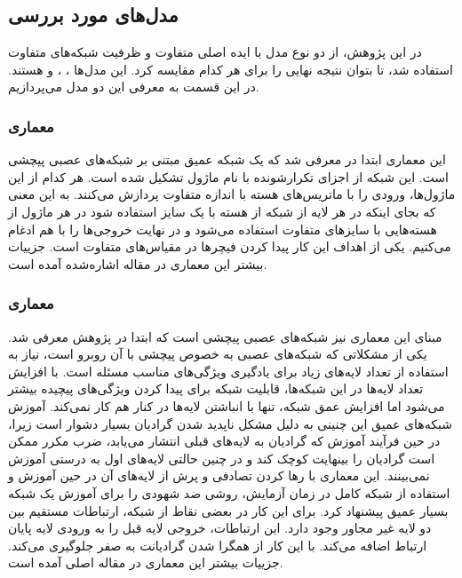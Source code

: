\subsection{مدل‌های مورد بررسی}\label{subsec:مدل‌های مورد بررسی}
در این پژوهش، از دو نوع مدل با ایده اصلی متفاوت و ظرفیت شبکه‌های متفاوت استفاده شد، تا بتوان نتیجه نهایی را برای هر کدام مقایسه کرد.
این مدل‌ها \cite{szegedy2016rethinking}، \cite{szegedy2017inception}، \cite{he2016deep} و \cite{he2016deep} هستند. 
در این قسمت به معرفی این دو مدل می‌پردازیم.

\subsubsection{معماری }
این معماری ابتدا در \cite{szegedy2015going} معرفی شد که یک شبکه عمیق مبتنی بر شبکه‌های عصبی پیچشی است. این شبکه از اجزای تکرارشونده با نام ماژول  تشکیل شده است. هر کدام از این ماژول‌ها، ورودی را با ماتریس‌های هسته با اندازه متفاوت پردازش می‌کنند. به این معنی که بجای اینکه در هر لایه از شبکه  از هسته با یک سایز استفاده شود در هر ماژول از هسته‌هایی با سایزهای متفاوت استفاده می‌شود و در نهایت خروجی‌ها را با هم ادغام می‌کنیم. یکی از اهداف این کار پیدا کردن فیچرها در مقیاس‌های متفاوت است. جزییات بیشتر این معماری در مقاله اشاره‌شده آمده است.


\subsubsection{معماری }
مبنای این معماری نیز شبکه‌های عصبی پیچشی است که ابتدا در پژوهش \cite{he2016deep} معرفی شد.
یکی از مشکلاتی که شبکه‌های عصبی به خصوص پیچشی با آن روبرو است، نیاز به استفاده از تعداد لایه‌های زیاد برای یادگیری ویژگی‌های مناسب مسئله است.
با افزایش تعداد لایه‌ها در این شبکه‌ها، قابلیت شبکه برای پیدا کردن ویژگی‌های پیچیده بیشتر می‌شود اما افزایش عمق شبکه، تنها با انباشتن لایه‌ها در کنار هم کار نمی‌کند.
آموزش شبکه‌های عمیق این چنینی به دلیل مشکل ناپدید شدن گرادیان بسیار دشوار است زیرا، در حین فرآیند آموزش که گرادیان به لایه‌های قبلی انتشار می‌یابد، ضرب مکرر ممکن است گرادیان را بینهایت کوچک کند و در چنین حالتی لایه‌های اول به درستی آموزش نمی‌بینند.
این معماری با رها کردن تصادفی و پرش از لایه‌های آن در حین آموزش و استفاده از شبکه کامل در زمان آزمایش، روشی ضد شهودی را برای آموزش یک شبکه بسیار عمیق پیشنهاد کرد. برای این کار در بعضی نقاط از شبکه، ارتباطات مستقیم بین دو لایه غیر مجاور وجود دارد. این ارتباطات، خروجی لایه قبل را به ورودی لایه پایان ارتباط اضافه می‌کند. با این کار از همگرا شدن گرادیانت به صفر جلوگیری می‌کند. جزییات بیشتر این معماری در مقاله اصلی آمده است.
